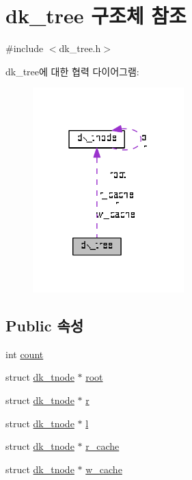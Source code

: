 \hypertarget{structdk__tree}{\section{dk\+\_\+tree 구조체 참조}
\label{structdk__tree}
}


{\ttfamily \#include $<$dk\+\_\+tree.\+h$>$}



dk\+\_\+tree에 대한 협력 다이어그램\+:
\nopagebreak
\begin{figure}[H]
\begin{center}
\leavevmode
\includegraphics[width=166pt]{structdk__tree__coll__graph}
\end{center}
\end{figure}
\subsection*{Public 속성}
\begin{DoxyCompactItemize}
\item 
int \hyperlink{structdk__tree_af79ecba1677f82486893accb0859a696}{count}
\item 
struct \hyperlink{structdk__tnode}{dk\+\_\+tnode} $\ast$ \hyperlink{structdk__tree_a6a5c48e2ff2494e10aafd1d0bc9d5992}{root}
\item 
struct \hyperlink{structdk__tnode}{dk\+\_\+tnode} $\ast$ \hyperlink{structdk__tree_a5d989a0efeadbc970750f1ac8ad4018e}{r}
\item 
struct \hyperlink{structdk__tnode}{dk\+\_\+tnode} $\ast$ \hyperlink{structdk__tree_a47101f1a0d29f4be791707a4b4b6477e}{l}
\item 
struct \hyperlink{structdk__tnode}{dk\+\_\+tnode} $\ast$ \hyperlink{structdk__tree_ae1a363a68dda726e3010e6766057dbbe}{r\+\_\+cache}
\item 
struct \hyperlink{structdk__tnode}{dk\+\_\+tnode} $\ast$ \hyperlink{structdk__tree_ab968d09f4098a59419b509bce61debcb}{w\+\_\+cache}
\end{DoxyCompactItemize}


